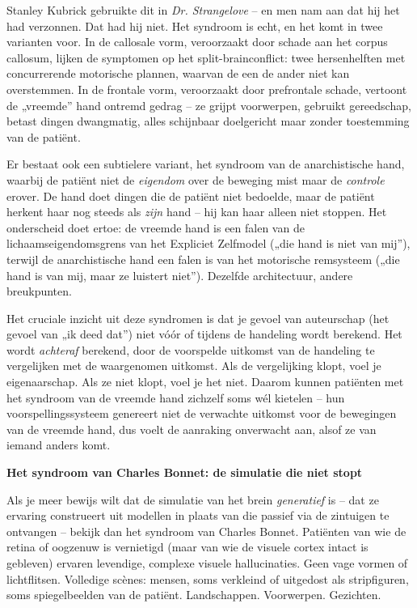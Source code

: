 \documentclass[11pt, twoside, openright]{book}
\begin{document}
Stanley Kubrick gebruikte dit in \textit{Dr. Strangelove} -- en men nam aan dat hij het had verzonnen. Dat had hij niet. Het syndroom is echt, en het komt in twee varianten voor. In de callosale vorm, veroorzaakt door schade aan het corpus callosum, lijken de symptomen op het split-brainconflict: twee hersenhelften met concurrerende motorische plannen, waarvan de een de ander niet kan overstemmen. In de frontale vorm, veroorzaakt door prefrontale schade, vertoont de „vreemde” hand ontremd gedrag -- ze grijpt voorwerpen, gebruikt gereedschap, betast dingen dwangmatig, alles schijnbaar doelgericht maar zonder toestemming van de patiënt.

Er bestaat ook een subtielere variant, het syndroom van de anarchistische hand, waarbij de patiënt niet de \textit{eigendom} over de beweging mist maar de \textit{controle} erover. De hand doet dingen die de patiënt niet bedoelde, maar de patiënt herkent haar nog steeds als \textit{zijn} hand -- hij kan haar alleen niet stoppen. Het onderscheid doet ertoe: de vreemde hand is een falen van de lichaamseigendomsgrens van het Expliciet Zelfmodel („die hand is niet van mij”), terwijl de anarchistische hand een falen is van het motorische remsysteem („die hand is van mij, maar ze luistert niet”). Dezelfde architectuur, andere breukpunten.

Het cruciale inzicht uit deze syndromen is dat je gevoel van auteurschap (het gevoel van „ik deed dat”) niet vóór of tijdens de handeling wordt berekend. Het wordt \textit{achteraf} berekend, door de voorspelde uitkomst van de handeling te vergelijken met de waargenomen uitkomst. Als de vergelijking klopt, voel je eigenaarschap. Als ze niet klopt, voel je het niet. Daarom kunnen patiënten met het syndroom van de vreemde hand zichzelf soms wél kietelen -- hun voorspellingssysteem genereert niet de verwachte uitkomst voor de bewegingen van de vreemde hand, dus voelt de aanraking onverwacht aan, alsof ze van iemand anders komt.

\textbf{Het syndroom van Charles Bonnet: de simulatie die niet stopt}

Als je meer bewijs wilt dat de simulatie van het brein \textit{generatief} is -- dat ze ervaring construeert uit modellen in plaats van die passief via de zintuigen te ontvangen -- bekijk dan het syndroom van Charles Bonnet. Patiënten van wie de retina of oogzenuw is vernietigd (maar van wie de visuele cortex intact is gebleven) ervaren levendige, complexe visuele hallucinaties. Geen vage vormen of lichtflitsen. Volledige scènes: mensen, soms verkleind of uitgedost als stripfiguren, soms spiegelbeelden van de patiënt. Landschappen. Voorwerpen. Gezichten.
\end{document}
